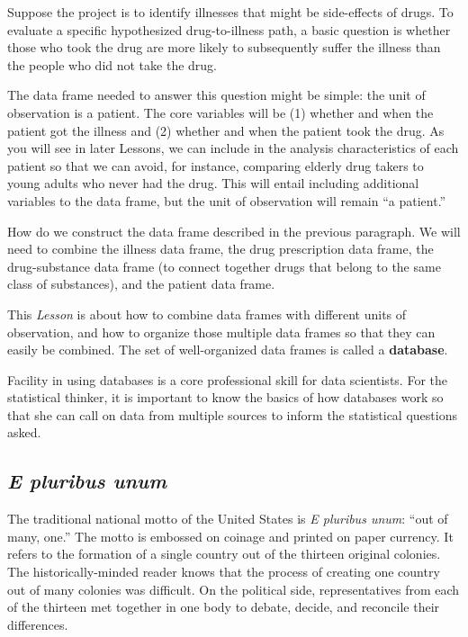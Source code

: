 \documentclass[
  letterpaper,
  DIV=11,
  numbers=noendperiod,
  oneside]{scrartcl}
\begin{document}
Suppose the project is to identify illnesses that might be side-effects
of drugs. To evaluate a specific hypothesized drug-to-illness path, a
basic question is whether those who took the drug are more likely to
subsequently suffer the illness than the people who did not take the
drug.

The data frame needed to answer this question might be simple: the unit
of observation is a patient. The core variables will be (1) whether and
when the patient got the illness and (2) whether and when the patient
took the drug. As you will see in later Lessons, we can include in the
analysis characteristics of each patient so that we can avoid, for
instance, comparing elderly drug takers to young adults who never had
the drug. This will entail including additional variables to the data
frame, but the unit of observation will remain ``a patient.''

How do we construct the data frame described in the previous paragraph.
We will need to combine the illness data frame, the drug prescription
data frame, the drug-substance data frame (to connect together drugs
that belong to the same class of substances), and the patient data
frame.

This \emph{Lesson} is about how to combine data frames with different
units of observation, and how to organize those multiple data frames so
that they can easily be combined. The set of well-organized data frames
is called a \textbf{database}.

Facility in using databases is a core professional skill for data
scientists. For the statistical thinker, it is important to know the
basics of how databases work so that she can call on data from multiple
sources to inform the statistical questions asked.

\subsection{\texorpdfstring{\emph{E pluribus
unum}}{E pluribus unum}}\label{e-pluribus-unum}

The traditional national motto of the United States is \emph{E pluribus
unum}: ``out of many, one.'' The motto is embossed on coinage and
printed on paper currency. It refers to the formation of a single
country out of the thirteen original colonies. The historically-minded
reader knows that the process of creating one country out of many
colonies was difficult. On the political side, representatives from each
of the thirteen met together in one body to debate, decide, and
reconcile their differences.
\end{document}
